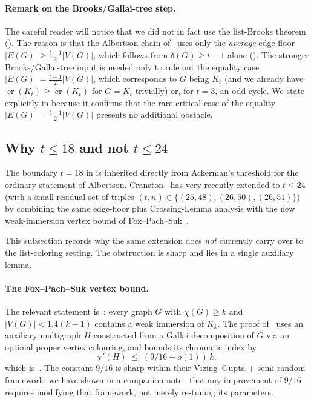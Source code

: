 \documentclass[11pt,a4paper]{article}
\theoremstyle{definition}
\DeclareMathOperator{\crN}{cr}
\begin{document}
\paragraph{Remark on the Brooks/Gallai-tree step.}
The careful reader will notice that we did not in fact use the
list-Brooks theorem (). The reason is that
the Albertson chain of~\cite{ACF, BT, Ackerman} uses only the
\emph{average} edge floor $|E(G)| \ge \tfrac{t-1}{2}|V(G)|$, which
follows from $\delta(G) \ge t - 1$ alone ().
The stronger Brooks/Gallai-tree input is needed only to rule out
the equality case $|E(G)| = \tfrac{t-1}{2}|V(G)|$, which corresponds
to $G$ being $K_t$ (and we already have $\crN(K_t) \ge \crN(K_t)$
for $G = K_t$ trivially) or, for $t = 3$, an odd cycle.
We state  explicitly in
 because it confirms that the rare critical
case of the equality $|E(G)| = \tfrac{t-1}{2}|V(G)|$ presents no
additional obstacle.

\subsection{Why \texorpdfstring{$t \le 18$}{t <= 18} and not
            \texorpdfstring{$t \le 24$}{t <= 24}}\label{ssec:boundary}

The boundary $t = 18$ in  is inherited directly
from Ackerman's threshold for the ordinary statement of Albertson.
Cranston~\cite{Cranston} has very recently extended
 to $t \le 24$ (with a small residual set of
triples $(t, n) \in \{(25, 48), (26, 50), (26, 51)\}$) by combining
the same edge-floor plus Crossing-Lemma analysis with the new
weak-immersion vertex bound of Fox--Pach--Suk~\cite[Theorem~1.2(i)]{FPS}.

This subsection records why the same extension does \emph{not}
currently carry over to the list-coloring setting. The
obstruction is sharp and lies in a single auxiliary lemma.

\paragraph{The Fox--Pach--Suk vertex bound.}
The relevant statement is~\cite[Theorem~1.2(i)]{FPS}: every graph
$G$ with $\chi(G) \ge k$ and $|V(G)| < 1.4(k - 1)$ contains a
weak immersion of $K_k$. The proof of~\cite[Theorem~1.2(i)]{FPS}
uses an auxiliary multigraph $H$ constructed from a Gallai
decomposition of $G$ via an optimal proper vertex colouring, and
bounds its chromatic index by
\begin{equation}\label{eq:fps23}
   \chi'(H) \;\le\; (9/16 + o(1))\,k,
\end{equation}
which is~\cite[Lemma~2.3]{FPS}. The constant $9/16$
is sharp within their Vizing--Gupta + semi-random framework; we
have shown in a companion note~\cite{D8} that any
improvement of $9/16$ requires modifying that framework, not merely
re-tuning its parameters.
\end{document}
